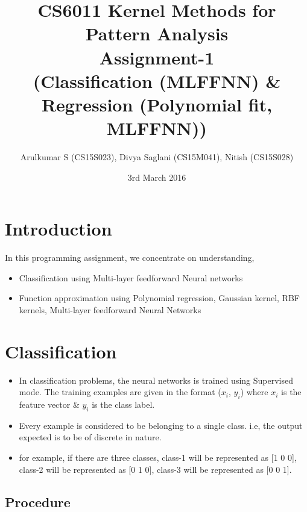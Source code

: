 \documentclass[fleqn]{article}
\title{CS6011 Kernel Methods for Pattern Analysis\\ Assignment-1 \\(Classification (MLFFNN) \& Regression (Polynomial fit, MLFFNN))}
\author{Arulkumar S (CS15S023), Divya Saglani (CS15M041), Nitish (CS15S028)}
\date{3rd March 2016}
\begin{document}
\setcounter{secnumdepth}{5}
\tracingall
\maketitle

\section{Introduction}

In this programming assignment, we concentrate on understanding,

\begin{itemize}
  \item Classification using Multi-layer feedforward Neural networks
  \item Function approximation using Polynomial regression, Gaussian kernel, RBF kernels, Multi-layer feedforward Neural Networks 
\end{itemize}

\section{Classification}

\begin{itemize}
\item In classification problems, the neural networks is trained using Supervised mode. 
The training examples are given in the format ($x_i$, $y_i$) where $x_i$ is the feature vector \& $y_i$ is the class label. 
\item Every example is considered to be belonging to a single class. i.e, the output expected is to be of discrete in nature.
\item for example, if there are three classes, class-1 will be represented as [1 0 0], class-2 will be represented as [0 1 0], class-3 will be represented as [0 0 1].
\end{itemize}

\subsection{Procedure}
\end{document}
